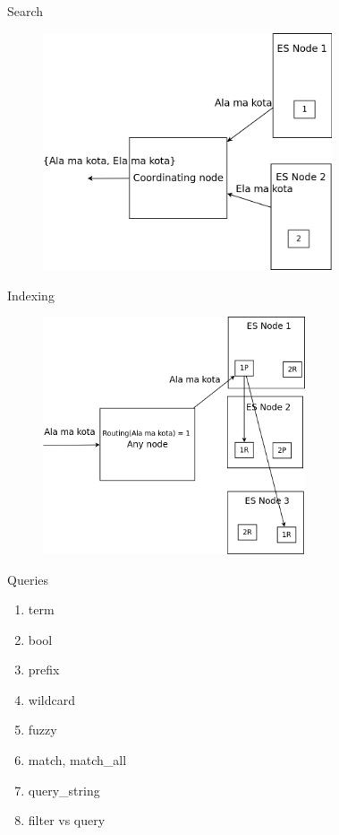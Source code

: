 \documentclass{beamer}
\begin{document}
\begin{frame}{Search}
	\begin{figure}
		\includegraphics[width=\textwidth,height=7cm,keepaspectratio=true]{search4}
	\end{figure}
\end{frame}
\begin{frame}{Indexing}
	\begin{figure}
		\includegraphics[width=\textwidth,height=7cm,keepaspectratio=true]{indexing}
	\end{figure}
\end{frame}
\begin{frame}{Queries}
	\begin{enumerate}
		\item term
		\item bool
		\item prefix
		\item wildcard
		\item fuzzy
		\item match, match\_all
		\item query\_string
		\item filter vs query
	\end{enumerate}
\end{frame}
\end{document}
